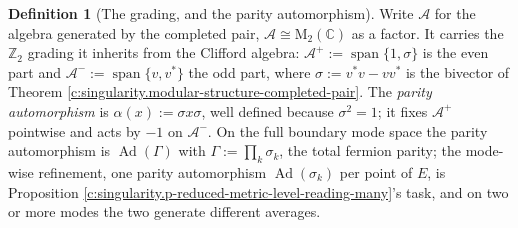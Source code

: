 \documentclass[11pt]{article}
\theoremstyle{definition}
\newtheorem{definition}[theorem]{Definition}
\theoremstyle{plain}
\providecommand{\Aa}{}\renewcommand{\Aa}{\mathcal{A}}
\providecommand{\Aev}{}\renewcommand{\Aev}{\mathcal{A}^{+}}
\providecommand{\Aod}{}\renewcommand{\Aod}{\mathcal{A}^{-}}
\providecommand{\C}{}\renewcommand{\C}{\mathbb{C}}
\providecommand{\Mat}{}\renewcommand{\Mat}{\mathrm{M}}
\begin{document}
\begin{definition}[The grading, and the parity automorphism]\label{c:obj.singularity.grading-parity-automorphism}
Write $\Aa$ for the algebra generated by the completed pair, $\Aa \cong \Mat_2(\C)$ as a factor. It carries the $\mathbb{Z}_2$ grading it inherits from the Clifford algebra: $\Aev := \operatorname{span}\{1, \sigma\}$ is the even part and $\Aod := \operatorname{span}\{v, v^{*}\}$ the odd part, where $\sigma := v^{*}v - vv^{*}$ is the bivector of Theorem \ref{c:singularity.modular-structure-completed-pair}. The \emph{parity automorphism} is $\alpha(x) := \sigma x \sigma$, well defined because $\sigma^{2} = 1$; it fixes $\Aev$ pointwise and acts by $-1$ on $\Aod$. On the full boundary mode space the parity automorphism is $\operatorname{Ad}(\Gamma)$ with $\Gamma := \prod_k \sigma_k$, the total fermion parity; the mode-wise refinement, one parity automorphism $\operatorname{Ad}(\sigma_k)$ per point of $E$, is Proposition \ref{c:singularity.p-reduced-metric-level-reading-many}'s task, and on two or more modes the two generate different averages.
\end{definition}
\end{document}
